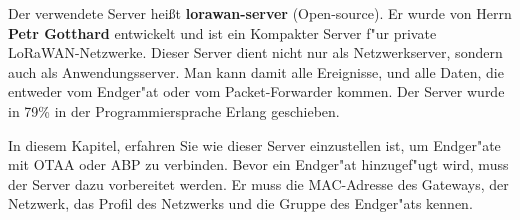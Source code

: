 Der verwendete Server hei\ss{}t \textbf{lorawan-server} (Open-source). Er
wurde von Herrn \textbf{Petr Gotthard} \cite{server} entwickelt und ist
ein Kompakter Server f"ur private LoRaWAN-Netzwerke. Dieser Server dient
nicht nur als Netzwerkserver, sondern auch als Anwendungsserver. Man kann
damit alle Ereignisse, und alle Daten, die entweder vom Endger"at oder
vom Packet-Forwarder kommen. Der Server wurde in 79\% in der
Programmiersprache Erlang \cite{erlang} geschieben.   

In diesem Kapitel, erfahren Sie wie dieser Server einzustellen ist, um
Endger"ate mit OTAA oder ABP zu verbinden. Bevor ein Endger"at
hinzugef"ugt wird, muss der Server dazu vorbereitet werden. Er muss die
MAC-Adresse des Gateways, der Netzwerk, das Profil des Netzwerks und die
Gruppe des Endger"ats kennen. 


